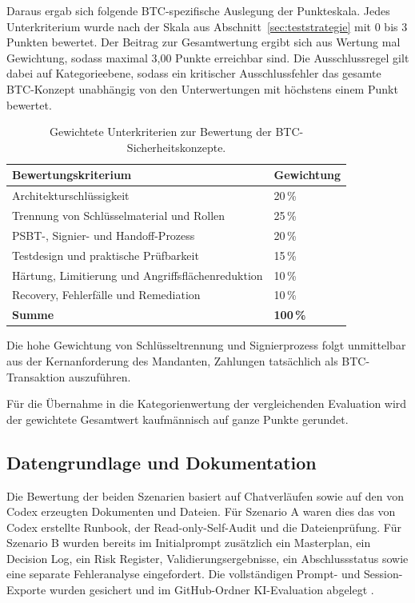 Daraus ergab sich folgende \ac{BTC}-spezifische Auslegung der Punkteskala.
Jedes Unterkriterium wurde nach der Skala aus Abschnitt~\ref{sec:teststrategie} mit 0 bis 3 Punkten bewertet.
Der Beitrag zur Gesamtwertung ergibt sich aus Wertung mal Gewichtung, sodass maximal 3{,}00 Punkte erreichbar sind. Die Ausschlussregel gilt dabei auf Kategorieebene, sodass ein kritischer Ausschlussfehler das gesamte \ac{BTC}-Konzept unabhängig von den Unterwertungen mit höchstens einem Punkt bewertet.

\begin{table}[htbp]
\centering \begin{tabular}{p{} p{}} 
\hline 
\textbf{Bewertungskriterium} & \textbf{Gewichtung} \\ 
\hline 
Architekturschlüssigkeit & 20\,\% \\ 
Trennung von Schlüsselmaterial und Rollen & 25\,\% \\ 
\ac{PSBT}-, Signier- und Handoff-Prozess & 20\,\% \\ 
Testdesign und praktische Prüfbarkeit & 15\,\% \\ 
Härtung, Limitierung und Angriffsflächenreduktion & 10\,\% \\
Recovery, Fehlerfälle und Remediation & 10\,\% \\ 
\hline 
\textbf{Summe} & \textbf{100\,\%} \\ 
\hline \end{tabular} 
\caption{Gewichtete Unterkriterien zur Bewertung der \ac{BTC}-Sicherheitskonzepte.} \label{tab:btc_bewertung_gewichtung} \end{table}

Die hohe Gewichtung von Schlüsseltrennung und Signierprozess folgt unmittelbar aus der
Kernanforderung des Mandanten, Zahlungen tatsächlich als \ac{BTC}-Transaktion auszuführen.

Für die Übernahme in die Kategorienwertung der vergleichenden Evaluation wird der gewichtete Gesamtwert kaufmännisch auf ganze Punkte gerundet.

\subsection{Datengrundlage und Dokumentation}

Die Bewertung der beiden Szenarien basiert auf Chatverläufen sowie auf den von Codex erzeugten Dokumenten und Dateien. Für Szenario A waren dies das von Codex erstellte Runbook, der Read-only-Self-Audit und die Dateienprüfung. Für Szenario B wurden bereits im Initialprompt zusätzlich ein Masterplan, ein Decision Log, ein Risk Register, Validierungsergebnisse, ein Abschlussstatus sowie eine separate Fehleranalyse eingefordert. Die vollständigen Prompt- und Session-Exporte wurden gesichert und im GitHub-Ordner \glqq \ac{KI}-Evaluation\grqq{} abgelegt \cite{ki_eval_github}.

